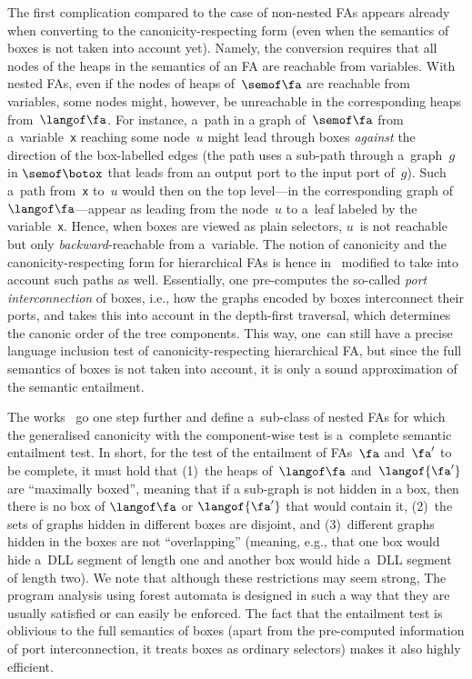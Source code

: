 The first complication compared to the case of non-nested FAs appears already
when converting to the canonicity-respecting form (even when the semantics of
boxes is not taken into account yet).
%
Namely, the conversion requires that all nodes of the heaps in
the semantics of an FA are reachable from variables.
%
With nested FAs, even if the nodes of heaps of~$\semof\fa$ are reachable from variables, 
some nodes might, however, be unreachable in the corresponding heaps from~$\langof\fa$. 
%
For instance, a~path in a graph of~$\semof\fa$ from a~variable~\texttt{x}
reaching some node~$u$ might lead through boxes \emph{against} the direction of
the box-labelled edges (the path uses a sub-path through a~graph~$g$ in
$\semof\botox$ that leads from an output port to the input port of~$g$).
%
Such a~path from~\texttt{x} to~$u$ would then on the top level---in
the corresponding graph of~$\langof\fa$---appear as leading from the node~$u$ to
a~leaf labeled by the variable~\texttt{x}.
Hence, when boxes are viewed as plain selectors, $u$~is not reachable but only
\emph{backward}-reachable from a~variable.
%
The notion of canonicity and the canonicity-respecting form for hierarchical FAs
is hence in~\cite{forester12,jiri:diza} modified to take into account
such paths as well.
%
Essentially, one pre-computes the so-called \emph{port interconnection} of boxes,
i.e., how the graphs encoded by boxes interconnect their ports, and takes this
into account in the depth-first traversal, which determines the canonic order of
the tree components.
%
This way, one~can still have a precise language inclusion test of canonicity-respecting hierarchical FA,
but since the full semantics of boxes is not taken into account, it is only a sound approximation of the semantic entailment.

The works~\cite{forester11,jiri:diza} go one step further and define
a~sub-class of nested FAs for which the generalised canonicity with the
component-wise test is a~complete semantic entailment test.
In short, for the test of the entailment of FAs~$\fa$ and~$\fa'$ to be complete, it must hold that
(1)~the heaps of~$\langof\fa$ and~$\langof{\fa'}$ are ``maximally boxed'',
meaning that if a sub-graph is not hidden in a box, then there is no box of
$\langof\fa$ or $\langof{\fa'}$ that would contain it,
(2)~the sets of graphs hidden in different boxes are disjoint,
and (3)~different graphs hidden in the boxes are not ``overlapping'' (meaning,
e.g., that one box would hide a~DLL segment of length one and another box would
hide a~DLL segment of length two).
%
We note that although these restrictions may seem strong, 
%
The program analysis using forest automata is designed in such a way that
they are usually satisfied or can easily be enforced.
%
The fact that the entailment test is oblivious to the full semantics of boxes (apart from the pre-computed information of port interconnection, it treats boxes as ordinary selectors) makes it also highly efficient.

